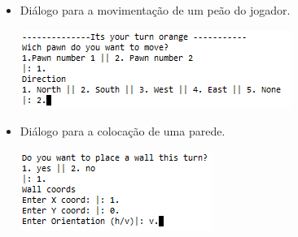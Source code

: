 \documentclass[a4paper]{article}
\begin{document}
  \begin{itemize}
		\item Diálogo para a movimentação de um peão do jogador.	
		\begin{center}
			\includegraphics[scale = 0.7]{fig7.png}
		\end{center}
		\item Diálogo para a colocação de uma parede.
		\begin{center}
			\includegraphics[scale = 0.7]{fig8.png}
		\end{center}
	\end{itemize}






\end{document}
